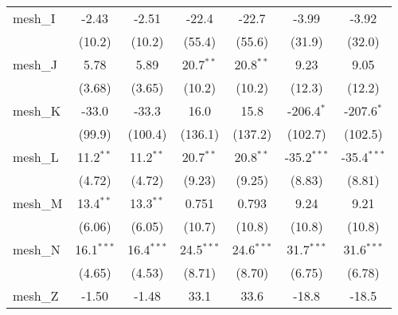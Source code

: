 \begin{tabular}{lcccccc}
   mesh\_I                                                     & -2.43          & -2.51         & -22.4          & -22.7          & -3.99         & -3.92\\   
                                                               & (10.2)         & (10.2)        & (55.4)         & (55.6)         & (31.9)        & (32.0)\\   
   mesh\_J                                                     & 5.78           & 5.89          & 20.7$^{**}$    & 20.8$^{**}$    & 9.23          & 9.05\\   
                                                               & (3.68)         & (3.65)        & (10.2)         & (10.2)         & (12.3)        & (12.2)\\   
   mesh\_K                                                     & -33.0          & -33.3         & 16.0           & 15.8           & -206.4$^{*}$  & -207.6$^{*}$\\   
                                                               & (99.9)         & (100.4)       & (136.1)        & (137.2)        & (102.7)       & (102.5)\\   
   mesh\_L                                                     & 11.2$^{**}$    & 11.2$^{**}$   & 20.7$^{**}$    & 20.8$^{**}$    & -35.2$^{***}$ & -35.4$^{***}$\\   
                                                               & (4.72)         & (4.72)        & (9.23)         & (9.25)         & (8.83)        & (8.81)\\   
   mesh\_M                                                     & 13.4$^{**}$    & 13.3$^{**}$   & 0.751          & 0.793          & 9.24          & 9.21\\   
                                                               & (6.06)         & (6.05)        & (10.7)         & (10.8)         & (10.8)        & (10.8)\\   
   mesh\_N                                                     & 16.1$^{***}$   & 16.4$^{***}$  & 24.5$^{***}$   & 24.6$^{***}$   & 31.7$^{***}$  & 31.6$^{***}$\\   
                                                               & (4.65)         & (4.53)        & (8.71)         & (8.70)         & (6.75)        & (6.78)\\   
   mesh\_Z                                                     & -1.50          & -1.48         & 33.1           & 33.6           & -18.8         & -18.5\\   

\end{tabular}
